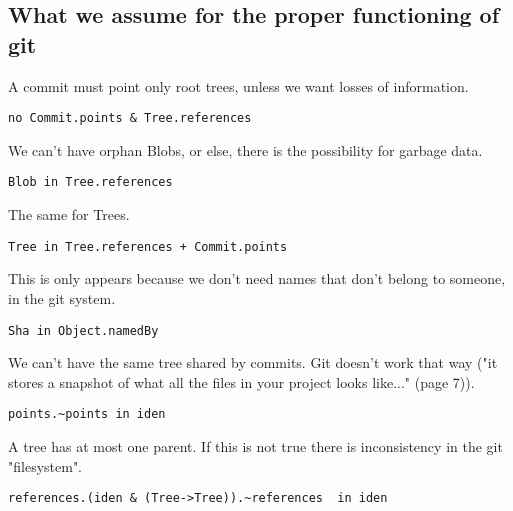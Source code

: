 \subsection{What we assume for the proper functioning of git}

A commit must point only root trees, unless we want
losses of information.
\begin{lstlisting}
no Commit.points & Tree.references    
\end{lstlisting}

We can't have orphan Blobs, or else, 
there is the possibility for garbage data.
\begin{lstlisting}
Blob in Tree.references
\end{lstlisting}

The same for Trees.
\begin{lstlisting}
Tree in Tree.references + Commit.points
\end{lstlisting}

This is only appears because we don't need
names that don't belong to someone, in the git
system.
\begin{lstlisting}
Sha in Object.namedBy
\end{lstlisting}

We can't have the same tree shared by commits. Git
doesn't work that way ("it stores a snapshot of what all 
the files in your project looks like..." \cite{gitComm} (page 7)).
\begin{lstlisting}
points.~points in iden 
\end{lstlisting}

A tree has at most one parent. If this is not true there 
is inconsistency in the git "filesystem".
\begin{lstlisting}
references.(iden & (Tree->Tree)).~references  in iden
\end{lstlisting}

